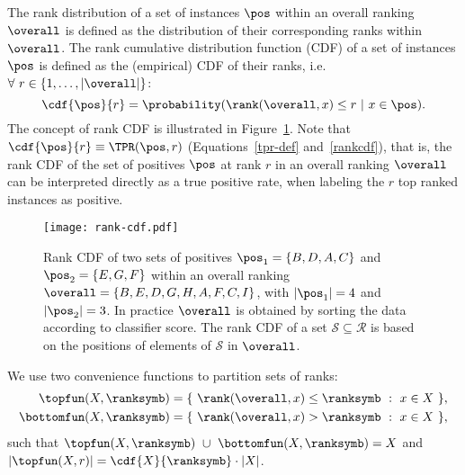 The rank distribution of a set of instances $\pos$ within an overall ranking $\overall$ is defined as the distribution of their corresponding ranks within $\overall$. The rank cumulative distribution function (CDF) of a set of instances $\pos$ is defined as the (empirical) CDF of their ranks, i.e. $\forall\ r \in \{1,\ldots,|\overall|\}$:
\begin{equation}
\cdf{\pos}{r} = \probability(\rank(\overall, x) \leq r \ |\ x \in \pos). \label{rankcdf}
\end{equation}
The concept of rank CDF is illustrated in Figure~\ref{fig:rank-cdf}. Note that $ \cdf{\pos}{r} \equiv \TPR(\pos, r) $ (Equations~\eqref{tpr-def} and~\eqref{rankcdf}), that is, the rank CDF of the set of positives $\pos$ at rank $r$ in an overall ranking $\overall$ can be interpreted directly as a true positive rate, when labeling the $r$ top ranked instances as positive.
\begin{figure}[ht]
  \centering
  \texttt{[image: rank-cdf.pdf]}
  \caption{Rank CDF of two sets of positives $\pos_1 = \{B, D, A, C\}$ and $\pos_2=\{E, G, F\}$ within an overall ranking $\overall=\{B,E,D,G,H,A,F,C,I\}$, with $|\pos_1|=4$ and $|\pos_2|=3$. In practice $\overall$ is obtained by sorting the data according to classifier score. The rank CDF of a set $\mathcal{S}\subseteq \mathcal{R}$ is based on the positions of elements of $\mathcal{S}$ in $\overall$. } 
  \label{fig:rank-cdf}
\end{figure}

We use two convenience functions to partition sets of ranks:
\begin{align*}
\topfun(X, \ranksymb) &= \{\ \rank(\overall, x) \leq \ranksymb\ :\ x \in X\ \}, \\
\bottomfun(X, \ranksymb) &= \{\ \rank(\overall, x) > \ranksymb\ :\ x \in X\ \},
\end{align*}
such that $\topfun(X,\ranksymb)\ \cup\ \bottomfun(X,\ranksymb) = X$ and $|\topfun(X,r)| = \cdf{X}{\ranksymb}\cdot |X|$. 


